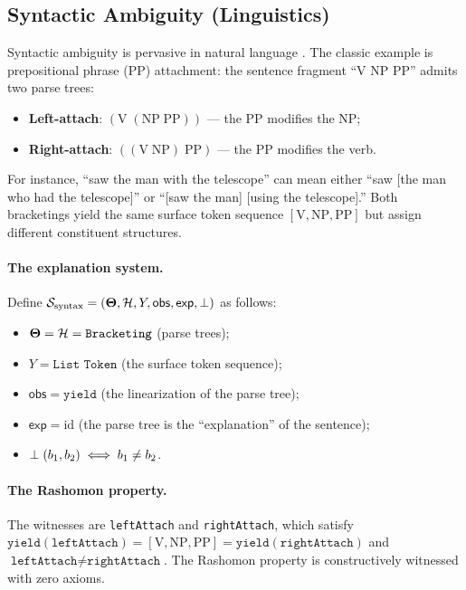\subsection{Syntactic Ambiguity (Linguistics)}
\label{sec:instance-syntax}

Syntactic ambiguity is pervasive in natural language
\citep{chomsky1957,jurafsky2024}.  The classic example is prepositional phrase
(PP) attachment: the sentence fragment ``V NP PP'' admits two parse trees:
\begin{itemize}
  \item \textbf{Left-attach}: $(\text{V}\;(\text{NP}\;\text{PP}))$ --- the PP
    modifies the NP;
  \item \textbf{Right-attach}: $((\text{V}\;\text{NP})\;\text{PP})$ --- the PP
    modifies the verb.
\end{itemize}
For instance, ``saw the man with the telescope'' can mean either ``saw
[the man who had the telescope]'' or ``[saw the man] [using the telescope].''
Both bracketings yield the same surface token sequence $[\text{V}, \text{NP},
\text{PP}]$ but assign different constituent structures.

\paragraph{The explanation system.}
Define $\mathcal{S}_{\mathrm{syntax}} = (\mathbf{\Theta}, \mathcal{H}, Y, \mathsf{obs},
\mathsf{exp}, \perp)$ as follows:
\begin{itemize}
  \item $\mathbf{\Theta} = \mathcal{H} = \texttt{Bracketing}$ (parse trees);
  \item $Y = \texttt{List Token}$ (the surface token sequence);
  \item $\mathsf{obs} = \texttt{yield}$ (the linearization of the parse tree);
  \item $\mathsf{exp} = \mathrm{id}$ (the parse tree is the ``explanation''
    of the sentence);
  \item $\perp(b_1, b_2) \iff b_1 \ne b_2$.
\end{itemize}

\paragraph{The Rashomon property.}
The witnesses are \texttt{leftAttach} and \texttt{rightAttach}, which satisfy
$\texttt{yield}(\texttt{leftAttach}) = [\text{V}, \text{NP}, \text{PP}] =
\texttt{yield}(\texttt{rightAttach})$ and
$\texttt{leftAttach} \ne \texttt{rightAttach}$.
The Rashomon property is constructively witnessed with zero axioms.

